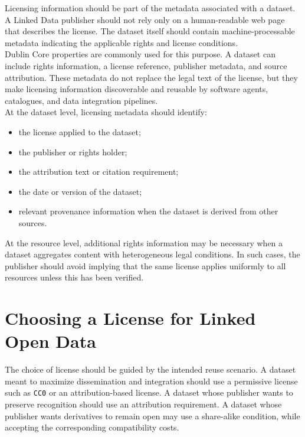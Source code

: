 \documentclass{scrbook}
\begin{document}
	Licensing information should be part of the metadata associated with a dataset. A Linked Data publisher should not rely only on a human-readable web page that describes the license. The dataset itself should contain machine-processable metadata indicating the applicable rights and license conditions.\\
	
	Dublin Core properties are commonly used for this purpose. A dataset can include rights information, a license reference, publisher metadata, and source attribution. These metadata do not replace the legal text of the license, but they make licensing information discoverable and reusable by software agents, catalogues, and data integration pipelines.\\
	
	At the dataset level, licensing metadata should identify:
	
	\begin{itemize}
	    \item the license applied to the dataset;
	    \item the publisher or rights holder;
	    \item the attribution text or citation requirement;
	    \item the date or version of the dataset;
	    \item relevant provenance information when the dataset is derived from other sources.
	\end{itemize}
	
	At the resource level, additional rights information may be necessary when a dataset aggregates content with heterogeneous legal conditions. In such cases, the publisher should avoid implying that the same license applies uniformly to all resources unless this has been verified.
	
	\section{Choosing a License for Linked Open Data}
	
	The choice of license should be guided by the intended reuse scenario. A dataset meant to maximize dissemination and integration should use a permissive license such as \texttt{CC0} or an attribution-based license. A dataset whose publisher wants to preserve recognition should use an attribution requirement. A dataset whose publisher wants derivatives to remain open may use a share-alike condition, while accepting the corresponding compatibility costs.\\
	
\end{document}
